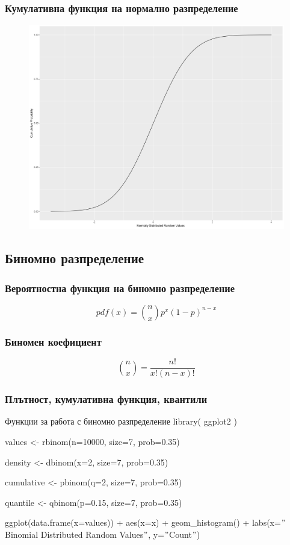 \documentclass{beamer}
\begin{document}
\begin{frame}
\frametitle{Кумулативна функция на нормално разпределение}
\begin{figure}[]\includegraphics[width=\textwidth,height=0.75\textheight]{pic0052}\end{figure}
\end{frame}

\subsection{Биномно разпределение}

\begin{frame}
\frametitle{Вероятностна функция на биномно разпределение}
\begin{equation}
pdf(x) = \binom{n}{x}p^{x}(1-p)^{n-x}
\end{equation}
\end{frame}

\begin{frame}
\frametitle{Биномен коефициент}
\begin{equation}
\binom{n}{x} = \frac{n!}{x!(n-x)!}
\end{equation}
\end{frame}

\begin{frame}
\frametitle{Плътност, кумулативна функция, квантили}
\begin{block}{Функции за работа с биномно разпределение}
library( ggplot2 )

values <- rbinom(n=10000, size=7, prob=0.35)

density <- dbinom(x=2, size=7, prob=0.35)

cumulative <- pbinom(q=2, size=7, prob=0.35)

quantile <- qbinom(p=0.15, size=7, prob=0.35)

ggplot(data.frame(x=values)) + aes(x=x) + geom\_histogram() + labs(x=$"$Binomial Distributed Random Values$"$, y=$"$Count$"$)
\end{block}
\end{frame}
\end{document}
